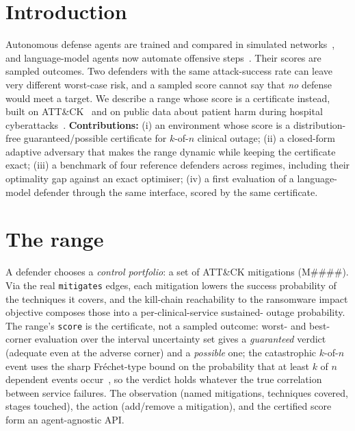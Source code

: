 \documentclass[conference,compsoc]{IEEEtran}
\begin{document}
\section{Introduction}
Autonomous defense agents are trained and compared in simulated
networks~\cite{standen2021cyborg}, and language-model agents now automate offensive
steps~\cite{deng2024pentestgpt}. Their scores are sampled outcomes. Two defenders with
the same attack-success rate can leave very different worst-case risk, and a sampled
score cannot say that \emph{no} defense would meet a target. We describe a range whose
score is a certificate instead, built on ATT\&CK~\cite{strom2018} and on public data
about patient harm during hospital cyberattacks~\cite{straw2025cipher}.
\textbf{Contributions:} (i) an environment whose score is a distribution-free
guaranteed/possible certificate for $k$-of-$n$ clinical outage; (ii) a closed-form
adaptive adversary that makes the range dynamic while keeping the certificate exact;
(iii) a benchmark of four reference defenders across \RangeRegimes{} regimes, including
their optimality gap against an exact optimiser; (iv) a first evaluation of a
language-model defender through the same interface, scored by the same certificate.

\section{The range}
A defender chooses a \emph{control portfolio}: a set of ATT\&CK mitigations
(M\#\#\#\#). Via the real \texttt{mitigates} edges, each mitigation lowers the
success probability of the techniques it covers, and the kill-chain reachability to
the ransomware impact objective composes those into a per-clinical-service sustained-
outage probability. The range's \texttt{score} is the certificate, not a sampled
outcome: worst- and best-corner evaluation over the interval uncertainty set gives a
\emph{guaranteed} verdict (adequate even at the adverse corner) and a \emph{possible}
one; the catastrophic $k$-of-$n$ event uses the sharp Fr\'echet-type bound on the
probability that at least $k$ of $n$ dependent events occur~\cite{ruschendorf1991}, so
the verdict holds whatever the true correlation between service failures. The observation (named mitigations, techniques
covered, stages touched), the action (add/remove a mitigation), and the certified
score form an agent-agnostic API.
\end{document}
